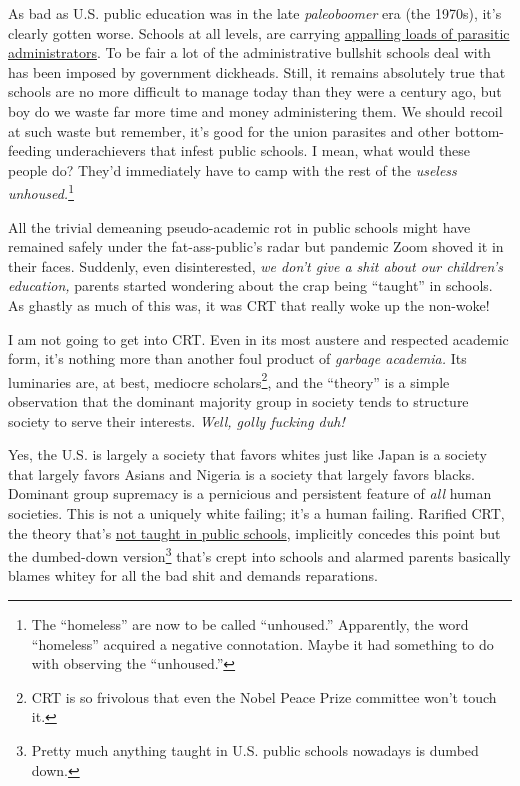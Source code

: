 As bad as U.S. public education was in the late \emph{paleoboomer} era
(the 1970s), it's clearly gotten worse. Schools at all levels, are
carrying
\href{https://www.huffpost.com/entry/higher-ed-administrators-growth_n_4738584}{appalling
loads of parasitic administrators}. To be fair a lot of the
administrative bullshit schools deal with has been imposed by government
dickheads. Still, it remains absolutely true that schools are no more
difficult to manage today than they were a century ago, but boy do we
waste far more time and money administering them. We should recoil
at such waste but remember, it's good for the union parasites and
other bottom-feeding underachievers that infest public schools. I mean,
what would these people do? They'd immediately have to camp with the
rest of the \emph{useless
unhoused.}\footnote{  The ``homeless'' are now to be called ``unhoused.'' Apparently, the
  word ``homeless'' acquired a negative connotation. Maybe it had
  something to do with observing the
  ``unhoused.''
}

All the trivial demeaning pseudo-academic rot in public schools might
have remained safely under the fat-ass-public's radar but pandemic Zoom
shoved it in their faces. Suddenly, even disinterested, \emph{we don't
give a shit about our children's education,} parents started wondering
about the crap being ``taught'' in schools. As ghastly as much of this
was, it was CRT that really woke up the non-woke!

I am not going to get into CRT. Even in its most austere and respected
academic form, it's nothing more than another foul product of
\emph{garbage academia.} Its luminaries are, at best, mediocre
scholars\footnote{  CRT is so frivolous that even the Nobel Peace Prize committee won't
  touch it.
}, and the ``theory''
is a simple observation that the dominant majority group in society
tends to structure society to serve their interests. \emph{Well, golly
fucking duh!}

Yes, the U.S. is largely a society that favors whites just like Japan is
a society that largely favors Asians and Nigeria is a society that
largely favors blacks. Dominant group supremacy is a pernicious and
persistent feature of \emph{all} human societies. This is not a uniquely
white failing; it's a human failing. Rarified CRT, the theory that's
\href{https://dailycaller.com/2021/07/29/critical-race-theory-law-school-antiracism/}{not
taught in public schools}, implicitly concedes this point but the
dumbed-down version\footnote{  Pretty much anything taught in U.S. public schools nowadays is dumbed
  down.
} that's crept into schools and alarmed parents basically blames whitey for all
the bad shit and demands reparations.

